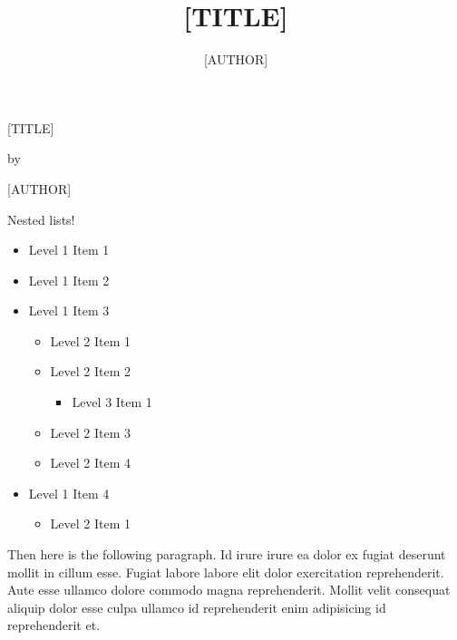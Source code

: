 \documentclass[
    12pt,
    letterpaper,
    oneside,
    noraggedright
]{turabian-researchpaper}
\title{{[TITLE]}}
\author{{[AUTHOR]}}
\makeatletter
\providecommand{\tightlist}{%
    \ifthenelse{\equal{\the\@listdepth}{1}}
    {}
    {\vspace{-\baselineskip}}
}
\makeatother
\begin{document}
    \begin{center}

    \thispagestyle{empty}
    \vspace*{1in}
    \begin{singlespace}
        {[TITLE]}
        \end{singlespace}
    \vspace{2in - \baselineskip}

    by
    \vspace{2in - \baselineskip}

    {[AUTHOR]}

    \vspace{2in - \baselineskip}

    \end{center}
    \newpage
    \setcounter{page}{1}

Nested lists!

\begin{itemize}
\tightlist
\item
  Level 1 Item 1
\item
  Level 1 Item 2
\item
  Level 1 Item 3

  \begin{itemize}
  \tightlist
  \item
    Level 2 Item 1
  \item
    Level 2 Item 2

    \begin{itemize}
    \tightlist
    \item
      Level 3 Item 1
    \end{itemize}
  \item
    Level 2 Item 3
  \item
    Level 2 Item 4
  \end{itemize}
\item
  Level 1 Item 4

  \begin{itemize}
  \tightlist
  \item
    Level 2 Item 1
  \end{itemize}
\end{itemize}

Then here is the following paragraph. Id irure irure ea dolor ex fugiat
deserunt mollit in cillum esse. Fugiat labore labore elit dolor
exercitation reprehenderit. Aute esse ullamco dolore commodo magna
reprehenderit. Mollit velit consequat aliquip dolor esse culpa ullamco
id reprehenderit enim adipisicing id reprehenderit et.
\end{document}
